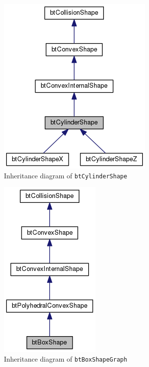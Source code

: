 \begin{figure}
\centering
\includegraphics[scale=0.2]{img/RigidBodies/btCylinderShapeGraph.png}
\caption{Inheritance diagram of \texttt{btCylinderShape}}
\label{fig: btCylSgraph}
\end{figure}
\begin{figure}
\centering
\includegraphics[scale=0.2]{img/RigidBodies/btBoxShapeGraph.png}
\caption{Inheritance diagram of \texttt{btBoxShapeGraph}}
\label{fig: btBoxSgraph}
\end{figure}

